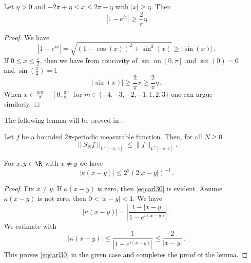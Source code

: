 \begin{lemma}
    \label{lower-secant-bound}
    \leanok
    Let $\eta>0$ and $-2\pi +\eta \le x\le 2\pi-\eta$ with $|x|\ge \eta$. Then
    \begin{equation}
        |1-e^{ix}|\ge \frac{2}{\pi} \eta
    \end{equation}
\end{lemma}
\begin{proof}
    \leanok
    We have
    $$
        |1 - e^{ix}| = \sqrt{(1 - \cos(x))^2 + \sin^2(x)} \ge |\sin(x)|\,.
    $$
    If $0 \le x \le \frac{\pi}{2}$, then we have from concavity of $\sin$ on $[0, \pi]$ and $\sin(0) = 0$ and $\sin(\frac{\pi}{2}) = 1$
    $$
        |\sin(x)| \ge \frac{2}{\pi} x \ge \frac{2}{\pi} \eta\,.
    $$
    When $x\in \frac{m\pi}{2} + [0, \frac{\pi}{2}]$ for $m \in \{-4, -3, -2, -1, 1, 2, 3\}$ one can argue similarly.
\end{proof}

The following lemma will be proved in .

\begin{lemma}
\label{spectral-projection-bound}
\leanok
{}
    Let $f$ be a bounded $2\pi$-periodic measurable function. Then, for all $N\ge 0$
   \begin{equation}\label{snbound}
   \|S_Nf\|_{L^2[-\pi, \pi]} \le \|f\|_{L^2[-\pi, \pi]}.
   \end{equation}
\end{lemma}

\begin{lemma}
\label{Hilbert-kernel-bound}
\leanok
{}
    For $x,y\in \R$ with $x\neq y$ we have
    \begin{equation}\label{eqcarl30}
        |\kappa(x-y)|\le 2^2(2|x-y|)^{-1}\, .
    \end{equation}
\end{lemma}
\begin{proof}
\leanok
    Fix $x\neq y$. If $\kappa(x-y)$ is zero, then \eqref{eqcarl30} is evident. Assume $\kappa(x-y)$ is not zero, then $0<|x-y|<1$.
    We have
\begin{equation}\label{eqcarl31}
|\kappa(x-y)|=\left|\frac {1-|x-y|}{1-e^{i(x-y)}}\right|\, .
\end{equation}
We estimate
with 
\begin{equation}\label{eqcarl311}
|\kappa(x-y)|\le \frac {1}{|1-e^{i(x-y)}|}\le \frac 2{|x-y|}\, .
\end{equation}
This proves \eqref{eqcarl30} in the given case and completes the proof of the lemma.
\end{proof}

